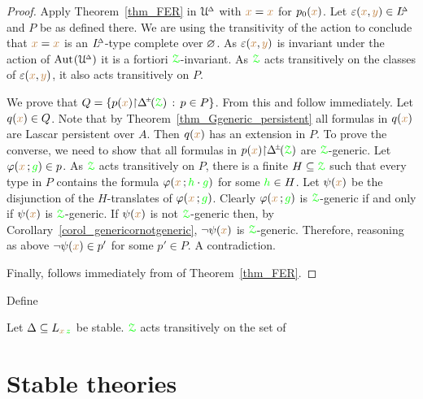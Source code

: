 \begin{proof}
  Apply Theorem~\ref{thm_FER} in $\EuScript U\kern-.2ex^{\scriptscriptstyle\Delta}$ with ${\color{brown} x}={\color{brown} x}$ for $p_0({\color{brown} x})$.
  Let $\varepsilon({\color{brown} x},{\color{brown} y})\in L\kern-.5ex^{\scriptscriptstyle\Delta}$ and $P$ be as defined there.
  We are using the transitivity of the action to conclude that ${\color{brown} x}={\color{brown} x}$ is an $L\kern-.5ex^{\scriptscriptstyle\Delta}$-type complete over $\varnothing$.
  As $\varepsilon({\color{brown} x},{\color{brown} y})$ is invariant under the action of ${\rm Aut\kern.15ex}(\EuScript U\kern-.2ex^{\scriptscriptstyle\Delta})$ it is a fortiori ${\color{green}\EuScript Z}$-invariant.
  As ${\color{green}\EuScript Z}$ acts transitively on the classes of $\varepsilon({\color{brown} x},{\color{brown} y})$, it also acts transitively on $P$.

  We prove that $Q=\{p({\mr x}){\restriction}\pmDelta(\grZ)\, :\, p\in P\}$.
  From this  and  follow immediately.
  Let $q({\color{brown} x})\in Q$. Note that by Theorem~\ref{thm_Ggeneric_persistent} all formulas in $q({\color{brown} x})$ are Lascar persistent over $A$.
  Then $q({\color{brown} x})$ has an extension in $P$.
  To prove the converse, we need to show that all formulas in $p({\mr x}){\restriction}\pmDelta(\grZ)$ are ${\color{green}\EuScript Z}$-generic.
  Let $\varphi({\color{brown} x}\,;{\color{green} g})\in p$.
  As ${\color{green}\EuScript Z}$ acts transitively on $P$, there is a finite $H\subseteq{\color{green}\EuScript Z}$ such that every type in $P$ contains  the formula $\varphi({\color{brown} x}\,;{\color{green} h}\cdot{\color{green}g})$ for some ${\color{green} h}\in H$.
  Let $\psi({\color{brown} x})$ be the disjunction of the $H$-translates of $\varphi({\color{brown} x}\,;{\color{green} g})$.
  Clearly $\varphi({\color{brown} x}\,;{\color{green} g})$ is ${\color{green}\EuScript Z}$-generic if and only if $\psi({\color{brown} x})$ is ${\color{green}\EuScript Z}$-generic.
  If $\psi({\color{brown} x})$ is not  ${\color{green}\EuScript Z}$-generic then, by Corollary~\ref{corol_genericornotgeneric}, $\neg\psi({\color{brown} x})$ is ${\color{green}\EuScript Z}$-generic.
  Therefore, reasoning as above $\neg\psi({\color{brown} x})\in p'$ for some $p'\in P$.
  A contradiction.

  Finally,  follows immediately from  of Theorem~\ref{thm_FER}.
\end{proof}

Define 



\begin{proposition}
  Let $\Delta\subseteq L_{{\color{brown} x}\,{\color{green} z}}$ be stable.
  ${\color{green}\EuScript Z}$ acts transitively on the set of 
\end{proposition}

\section{Stable theories}
\label{stable_theories}

